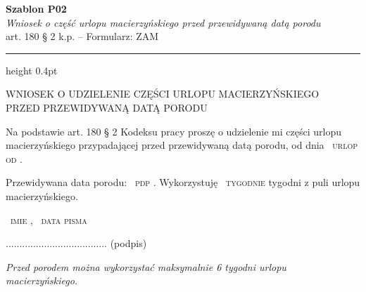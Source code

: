 \documentclass[11pt,a4paper]{article}
\newcommand{\Pole}[1]{%
  \textcolor{szary}{\dotfill}\,%
  {\scriptsize\textcolor{szary}{\textsc{#1}}}%
}
\begin{document}
\begin{flushright}
{\footnotesize\color{szary}
\textbf{Szablon P02}\\
{\itshape Wniosek o część urlopu macierzyńskiego przed przewidywaną datą porodu}\\
art. 180 \S{} 2 k.p. -- Formularz: ZAM}\
\end{flushright}

\vspace{0.5em}
{\color{ramka}\hrule height 0.4pt}
\vspace{0.8em}

WNIOSEK O UDZIELENIE CZĘŚCI URLOPU MACIERZYŃSKIEGO\\[-2pt]
PRZED PRZEWIDYWANĄ DATĄ PORODU

Na podstawie art. 180 \S{} 2 Kodeksu pracy proszę o udzielenie mi części urlopu
macierzyńskiego przypadającej przed przewidywaną datą porodu, od dnia \Pole{urlop od}.

Przewidywana data porodu: \Pole{pdp}.
Wykorzystuję \Pole{tygodnie} tygodni z puli urlopu macierzyńskiego.

\Pole{imie}, \Pole{data pisma}
.....................................
(podpis)

\vfill
{\footnotesize\textcolor{szary}\itshape Przed porodem można wykorzystać maksymalnie 6 tygodni urlopu macierzyńskiego.}
\end{document}
